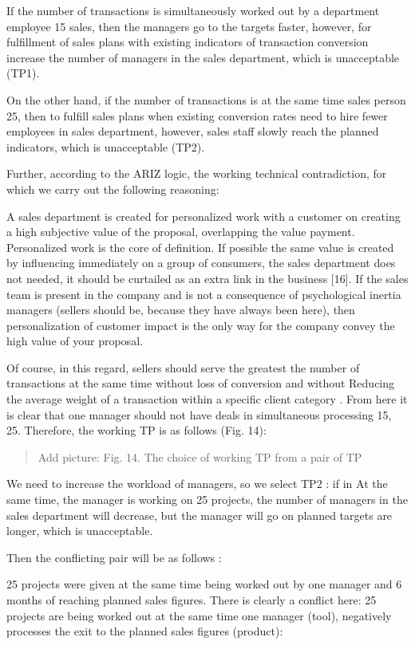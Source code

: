 \documentclass[11pt,a4paper]{book}
\newcommand{\addpicture}[1]{
  \begin{quote} Add picture: #1\end{quote}
}
\begin{document}
If the number of transactions is simultaneously worked out by a department
employee 15 sales, then the managers go to the targets faster, however, for
fulfillment of sales plans with existing indicators of transaction conversion
increase the number of managers in the sales department, which is unacceptable
(TP1).

On the other hand, if the number of transactions is at the same time sales
person 25, then to fulfill sales plans when existing conversion rates need to
hire fewer employees in sales department, however, sales staff slowly reach
the planned indicators, which is unacceptable (TP2).

Further, according to the ARIZ logic, the working technical contradiction, for
which we carry out the following reasoning:

A sales department is created for personalized work with a customer on
creating a high subjective value of the proposal, overlapping the value
payment. Personalized work is the core of definition. If possible the same
value is created by influencing immediately on a group of consumers, the sales
department does not needed, it should be curtailed as an extra link in the
business [16]. If the sales team is present in the company and is not a
consequence of psychological inertia managers (sellers should be, because they
have always been here), then personalization of customer impact is the only
way for the company convey the high value of your proposal.

Of course, in this regard, sellers should serve the greatest the number of
transactions at the same time without loss of conversion and without Reducing
the average weight of a transaction within a specific client category . From
here it is clear that one manager should not have deals in simultaneous
processing 15, 25. Therefore, the working TP is as follows (Fig. 14):

\addpicture{Fig. 14. The choice of working TP from a pair of TP}

We need to increase the workload of managers, so we select TP2 : if in At the
same time, the manager is working on 25 projects, the number of managers in
the sales department will decrease, but the manager will go on planned targets
are longer, which is unacceptable.

Then the conflicting pair will be as follows :

25 projects were given at the same time being worked out by one manager and 6
months of reaching planned sales figures.  There is clearly a conflict here:
25 projects are being worked out at the same time one manager (tool),
negatively processes the exit to the planned sales figures (product):
\end{document}
